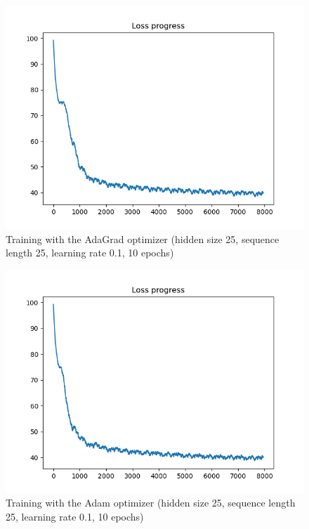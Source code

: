 \documentclass[11pt]{article}
\begin{document}
			\begin{figure}[h]
				\centering
				\includegraphics[width=\linewidth]{img/losses_dinos_adagrad_h25_s25_e10_lr01.png}
				\caption{Training with the AdaGrad optimizer (hidden size 25, sequence length 25, learning rate 0.1, 10 epochs)}
				\label{fig:lossesdinosadagradh25s25e10lr01}
			\end{figure}
		
			\begin{figure}[h]
				\centering
				\includegraphics[width=\linewidth]{img/losses_dinos_adam_h25_s25_e10_lr01.png}
				\caption{Training with the Adam optimizer (hidden size 25, sequence length 25, learning rate 0.1, 10 epochs)}
				\label{fig:lossesdinosadamh25s25e10lr01}
			\end{figure}
		
\end{document}
